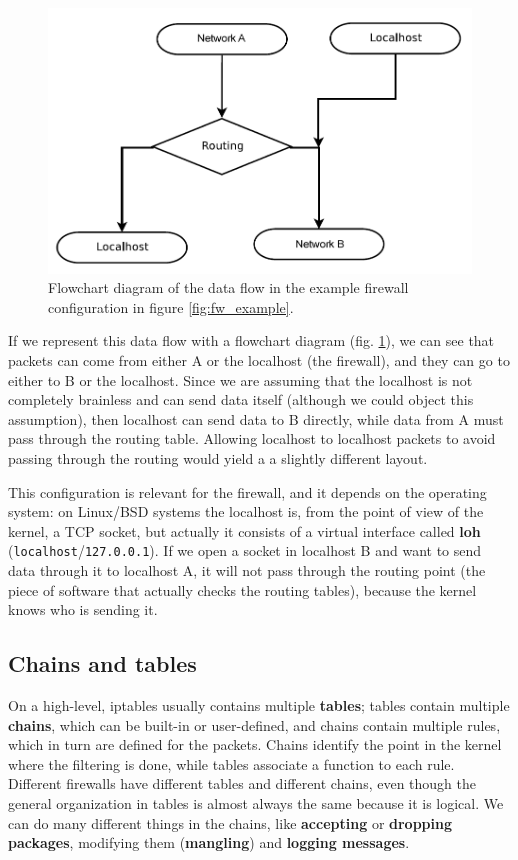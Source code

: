\begin{figure}[h]
    \centering
    \includegraphics[scale=0.7]{img/fw_logic.png}
    \decoRule
    \caption{Flowchart diagram of the data flow in the example firewall configuration in figure \ref{fig:fw_example}.}
    \label{fig:fw_logic}
\end{figure}

If we represent this data flow with a flowchart diagram (fig. \ref{fig:fw_logic}), we can see that packets can come from either A or the localhost (the firewall), and they can go to either to B or the localhost. Since we are assuming that the localhost is not completely brainless and can send data itself (although we could object this assumption), then localhost can send data to B directly, while data from A must pass through the routing table. Allowing localhost to localhost packets to avoid passing through the routing would yield a a slightly different layout.

This configuration is relevant for the firewall, and it depends on the operating system: on Linux/BSD systems the localhost is, from the point of view of the kernel, a TCP socket, but actually it consists of a virtual interface called \textbf{loh} (\texttt{localhost}/\texttt{127.0.0.1}). If we open a socket in localhost B and want to send data through it to localhost A, it will not pass through the routing point (the piece of software that actually checks the routing tables), because the kernel knows who is sending it.


\subsection{Chains and tables}
On a high-level, iptables usually contains multiple \textbf{tables}; tables contain multiple \textbf{chains}, which can be built-in or user-defined, and chains contain multiple rules, which in turn are defined for the packets. Chains identify the point in the kernel where the filtering is done, while tables associate a function to each rule. Different firewalls have different tables and different chains, even though the general organization in tables is almost always the same because it is logical.
We can do many different things in the chains, like \textbf{accepting} or \textbf{dropping packages}, modifying them (\textbf{mangling}) and \textbf{logging messages}.

